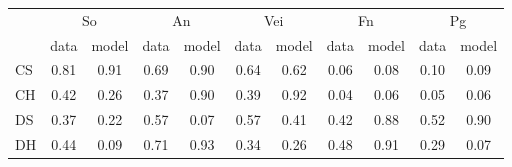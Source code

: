 \begin{tabular}{lcccccccccc}
\toprule
 & \multicolumn{2}{c}{So} & \multicolumn{2}{c}{An} & \multicolumn{2}{c}{Vei} & \multicolumn{2}{c}{Fn} & \multicolumn{2}{c}{Pg} \\
\cmidrule(lr){2-3}\cmidrule(lr){4-5}\cmidrule(lr){6-7}\cmidrule(lr){8-9}\cmidrule(lr){10-11}
 & data & model & data & model & data & model & data & model & data & model \\
\midrule
CS & 0.81 & 0.91 & 0.69 & 0.90 & 0.64 & 0.62 & 0.06 & 0.08 & 0.10 & 0.09 \\
CH & 0.42 & 0.26 & 0.37 & 0.90 & 0.39 & 0.92 & 0.04 & 0.06 & 0.05 & 0.06 \\
DS & 0.37 & 0.22 & 0.57 & 0.07 & 0.57 & 0.41 & 0.42 & 0.88 & 0.52 & 0.90 \\
DH & 0.44 & 0.09 & 0.71 & 0.93 & 0.34 & 0.26 & 0.48 & 0.91 & 0.29 & 0.07 \\
\bottomrule
\end{tabular}
